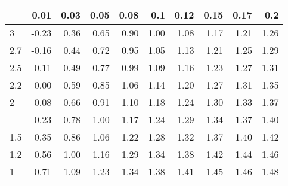 
\begin{tabular}{lrrrrrrrrr}
\toprule
  & 0.01 & 0.03 & 0.05 & 0.08 & 0.1 & 0.12 & 0.15 & 0.17 & 0.2\\
\midrule
3 & -0.23 & 0.36 & 0.65 & 0.90 & 1.00 & 1.08 & 1.17 & 1.21 & 1.26\\
2.7 & -0.16 & 0.44 & 0.72 & 0.95 & 1.05 & 1.13 & 1.21 & 1.25 & 1.29\\
2.5 & -0.11 & 0.49 & 0.77 & 0.99 & 1.09 & 1.16 & 1.23 & 1.27 & 1.31\\
2.2 & 0.00 & 0.59 & 0.85 & 1.06 & 1.14 & 1.20 & 1.27 & 1.31 & 1.35\\
2 & 0.08 & 0.66 & 0.91 & 1.10 & 1.18 & 1.24 & 1.30 & 1.33 & 1.37\\
\addlinespace
1.7 & 0.23 & 0.78 & 1.00 & 1.17 & 1.24 & 1.29 & 1.34 & 1.37 & 1.40\\
1.5 & 0.35 & 0.86 & 1.06 & 1.22 & 1.28 & 1.32 & 1.37 & 1.40 & 1.42\\
1.2 & 0.56 & 1.00 & 1.16 & 1.29 & 1.34 & 1.38 & 1.42 & 1.44 & 1.46\\
1 & 0.71 & 1.09 & 1.23 & 1.34 & 1.38 & 1.41 & 1.45 & 1.46 & 1.48\\
\bottomrule
\end{tabular}

